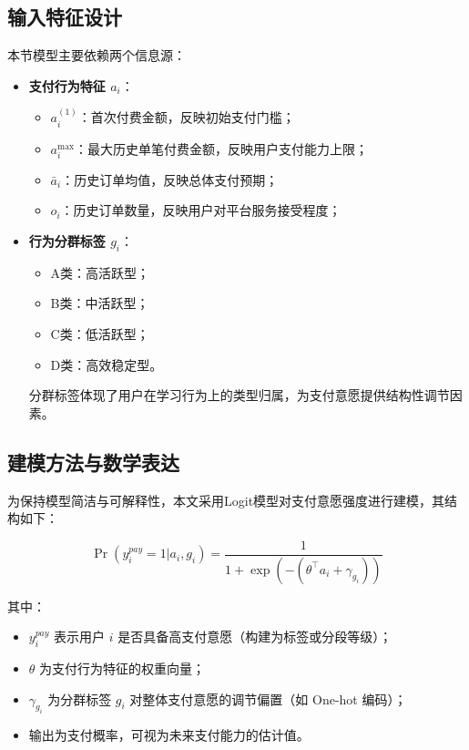 \subsection{输入特征设计}

本节模型主要依赖两个信息源：

\begin{itemize}
  \item \textbf{支付行为特征 $a_i$}：
  \begin{itemize}
    \item $a_i^{(1)}$：首次付费金额，反映初始支付门槛；
    \item $a_i^{\max}$：最大历史单笔付费金额，反映用户支付能力上限；
    \item $\bar{a}_i$：历史订单均值，反映总体支付预期；
    \item $o_i$：历史订单数量，反映用户对平台服务接受程度；
  \end{itemize}

  \item \textbf{行为分群标签 $g_i$}：
  \begin{itemize}
    \item A类：高活跃型；
    \item B类：中活跃型；
    \item C类：低活跃型；
    \item D类：高效稳定型。
  \end{itemize}
  分群标签体现了用户在学习行为上的类型归属，为支付意愿提供结构性调节因素。
\end{itemize}

\subsection{建模方法与数学表达}

为保持模型简洁与可解释性，本文采用Logit模型对支付意愿强度进行建模，其结构如下：

\begin{equation}
\Pr(y_i^{pay} = 1 | a_i, g_i) = \frac{1}{1 + \exp(-(\theta^\top a_i + \gamma_{g_i}))}
\end{equation}

其中：
\begin{itemize}
  \item $y_i^{pay}$ 表示用户 $i$ 是否具备高支付意愿（构建为标签或分段等级）；
  \item $\theta$ 为支付行为特征的权重向量；
  \item $\gamma_{g_i}$ 为分群标签 $g_i$ 对整体支付意愿的调节偏置（如 One-hot 编码）；
  \item 输出为支付概率，可视为未来支付能力的估计值。
\end{itemize}

